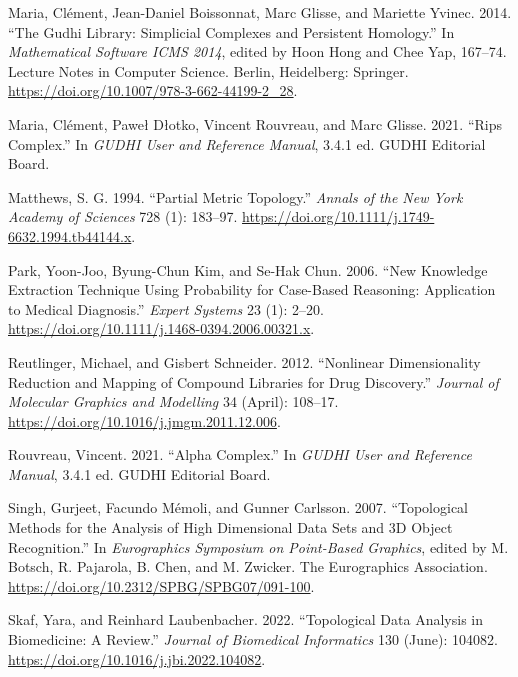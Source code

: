 \documentclass{article}
\newlength{\cslhangindent}
\newlength{\cslentryspacingunit} %
\newenvironment{CSLReferences}[2] %
 {%
  \setlength{\parindent}{0pt}
  \ifodd #1
  \let\oldpar\par
  \def\par{\hangindent=\cslhangindent\oldpar}
  \fi
  \setlength{\parskip}{#2\cslentryspacingunit}
 }%
 {}
\begin{document}
\begin{CSLReferences}{1}{0}
\leavevmode{}%
Maria, Clément, Jean-Daniel Boissonnat, Marc Glisse, and Mariette
Yvinec. 2014. {``The {Gudhi Library}: {Simplicial Complexes} and
{Persistent Homology}.''} In \emph{Mathematical {Software} \textendash{}
{ICMS} 2014}, edited by Hoon Hong and Chee Yap, 167--74. Lecture {Notes}
in {Computer Science}. {Berlin, Heidelberg}: {Springer}.
\url{https://doi.org/10.1007/978-3-662-44199-2_28}.

\leavevmode{}%
Maria, Clément, Paweł Dłotko, Vincent Rouvreau, and Marc Glisse. 2021.
{``Rips Complex.''} In \emph{{GUDHI User} and {Reference Manual}}, 3.4.1
ed. {GUDHI Editorial Board}.

\leavevmode{}%
Matthews, S. G. 1994. {``Partial {Metric Topology}.''} \emph{Annals of
the New York Academy of Sciences} 728 (1): 183--97.
\url{https://doi.org/10.1111/j.1749-6632.1994.tb44144.x}.

\leavevmode{}%
Park, Yoon-Joo, Byung-Chun Kim, and Se-Hak Chun. 2006. {``New Knowledge
Extraction Technique Using Probability for Case-Based Reasoning:
Application to Medical Diagnosis.''} \emph{Expert Systems} 23 (1):
2--20. \url{https://doi.org/10.1111/j.1468-0394.2006.00321.x}.

\leavevmode{}%
Reutlinger, Michael, and Gisbert Schneider. 2012. {``Nonlinear
Dimensionality Reduction and Mapping of Compound Libraries for Drug
Discovery.''} \emph{Journal of Molecular Graphics and Modelling} 34
(April): 108--17. \url{https://doi.org/10.1016/j.jmgm.2011.12.006}.

\leavevmode{}%
Rouvreau, Vincent. 2021. {``Alpha Complex.''} In \emph{{GUDHI User} and
{Reference Manual}}, 3.4.1 ed. {GUDHI Editorial Board}.

\leavevmode{}%
Singh, Gurjeet, Facundo Mémoli, and Gunner Carlsson. 2007.
{``Topological {Methods} for the {Analysis} of {High Dimensional Data
Sets} and {3D Object Recognition}.''} In \emph{Eurographics {Symposium}
on {Point-Based Graphics}}, edited by M. Botsch, R. Pajarola, B. Chen,
and M. Zwicker. {The Eurographics Association}.
\url{https://doi.org/10.2312/SPBG/SPBG07/091-100}.

\leavevmode{}%
Skaf, Yara, and Reinhard Laubenbacher. 2022. {``Topological Data
Analysis in Biomedicine: {A} Review.''} \emph{Journal of Biomedical
Informatics} 130 (June): 104082.
\url{https://doi.org/10.1016/j.jbi.2022.104082}.


\end{CSLReferences}
\end{document}
